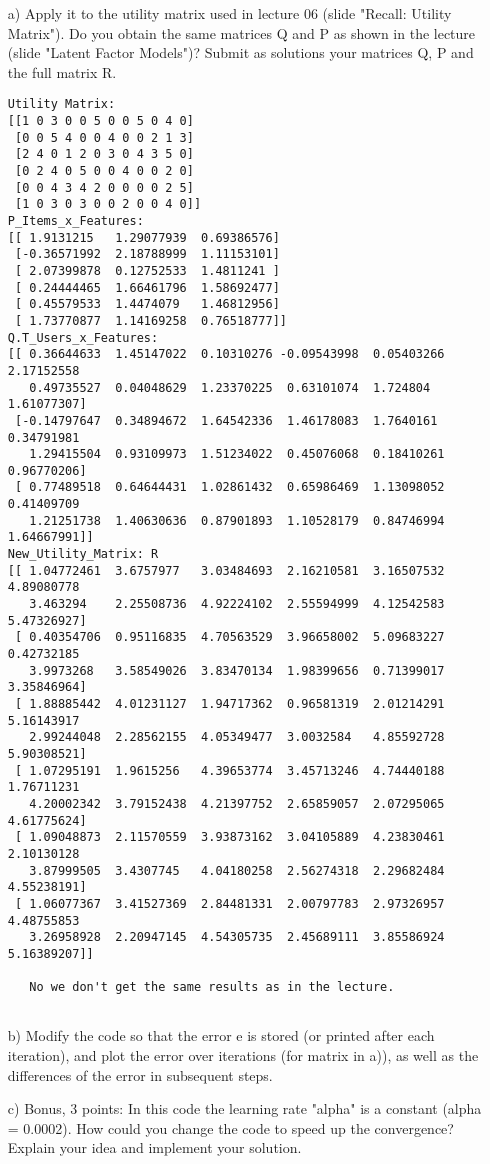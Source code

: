 \documentclass[11pt,a4paper]{scrartcl}
\begin{document}
\begin{itemize}
	\item [a)] Apply it to the utility matrix used in lecture 06 (slide "Recall: Utility Matrix"). Do you obtain the same matrices Q and P as shown in the lecture (slide "Latent Factor Models")? Submit as solutions your matrices Q, P and the full matrix R.

\begin{verbatim}	
Utility Matrix:
[[1 0 3 0 0 5 0 0 5 0 4 0]
 [0 0 5 4 0 0 4 0 0 2 1 3]
 [2 4 0 1 2 0 3 0 4 3 5 0]
 [0 2 4 0 5 0 0 4 0 0 2 0]
 [0 0 4 3 4 2 0 0 0 0 2 5]
 [1 0 3 0 3 0 0 2 0 0 4 0]]
P_Items_x_Features:
[[ 1.9131215   1.29077939  0.69386576]
 [-0.36571992  2.18788999  1.11153101]
 [ 2.07399878  0.12752533  1.4811241 ]
 [ 0.24444465  1.66461796  1.58692477]
 [ 0.45579533  1.4474079   1.46812956]
 [ 1.73770877  1.14169258  0.76518777]]
Q.T_Users_x_Features:
[[ 0.36644633  1.45147022  0.10310276 -0.09543998  0.05403266  2.17152558
   0.49735527  0.04048629  1.23370225  0.63101074  1.724804    1.61077307]
 [-0.14797647  0.34894672  1.64542336  1.46178083  1.7640161   0.34791981
   1.29415504  0.93109973  1.51234022  0.45076068  0.18410261  0.96770206]
 [ 0.77489518  0.64644431  1.02861432  0.65986469  1.13098052  0.41409709
   1.21251738  1.40630636  0.87901893  1.10528179  0.84746994  1.64667991]]
New_Utility_Matrix: R
[[ 1.04772461  3.6757977   3.03484693  2.16210581  3.16507532  4.89080778
   3.463294    2.25508736  4.92224102  2.55594999  4.12542583  5.47326927]
 [ 0.40354706  0.95116835  4.70563529  3.96658002  5.09683227  0.42732185
   3.9973268   3.58549026  3.83470134  1.98399656  0.71399017  3.35846964]
 [ 1.88885442  4.01231127  1.94717362  0.96581319  2.01214291  5.16143917
   2.99244048  2.28562155  4.05349477  3.0032584   4.85592728  5.90308521]
 [ 1.07295191  1.9615256   4.39653774  3.45713246  4.74440188  1.76711231
   4.20002342  3.79152438  4.21397752  2.65859057  2.07295065  4.61775624]
 [ 1.09048873  2.11570559  3.93873162  3.04105889  4.23830461  2.10130128
   3.87999505  3.4307745   4.04180258  2.56274318  2.29682484  4.55238191]
 [ 1.06077367  3.41527369  2.84481331  2.00797783  2.97326957  4.48755853
   3.26958928  2.20947145  4.54305735  2.45689111  3.85586924  5.16389207]]
   
   No we don't get the same results as in the lecture.
   
\end{verbatim}	
	\item [b)] Modify the code so that the error e is stored (or printed after each iteration), and plot the error over iterations (for matrix in a)), as well as the differences of the error in subsequent steps.
	\item [c)] Bonus, 3 points: In this code the learning rate "alpha" is a constant (alpha = 0.0002). How could you change the code to speed up the convergence? Explain your idea and implement your solution.
\end{itemize}
	
\end{document}
